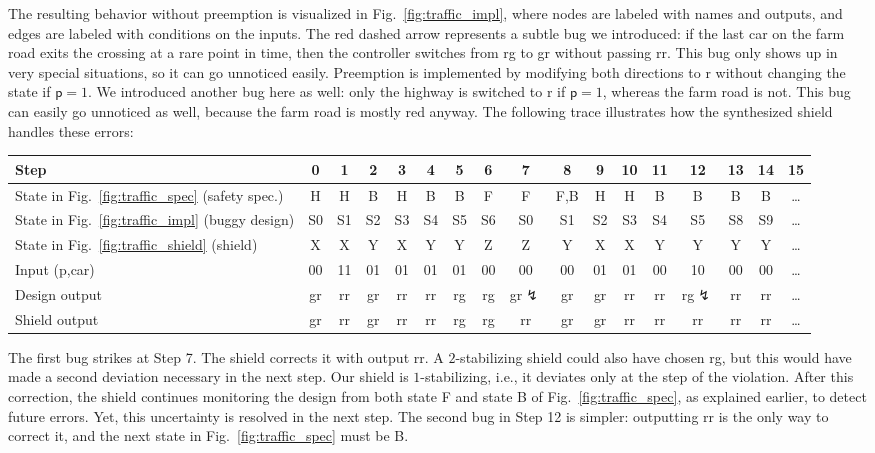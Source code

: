 \documentclass{llncs}
\newcommand{\err}{{\color{darkred}$\lightning$}}
\begin{document}
The resulting behavior without preemption is visualized in 
Fig.~\ref{fig:traffic_impl}, where nodes are labeled with names and 
outputs, and edges are labeled with conditions on the inputs.  The red 
dashed arrow represents a subtle bug we introduced: if the last car on 
the farm road exits the crossing at a rare point in time, then the 
controller switches from \textsf{rg} to \textsf{gr} without passing 
\textsf{rr}. This bug only shows up in very special situations, so it 
can go unnoticed easily.  Preemption is implemented by modifying both 
directions to \textsf{r} without changing the state if $\textsf{p}=1$.  
We introduced another bug here as well: only the highway is switched to 
\textsf{r} if $\textsf{p}=1$, whereas the farm road is not. This bug can 
easily go unnoticed as well, because the farm road is mostly red anyway.
The following trace illustrates how the synthesized shield handles these 
errors:

\begin{center}
\setlength{\tabcolsep}{1.3pt}
\begin{tabular}{l|c|c|c|c|c|c|c|c|c|c|c|c|c|c|c|c}\hline
Step                                 &0 &1 &2 &3 &4 &5 &6 &7     &8  &9 &10&11&12    &13&14&15    \\
\hline
State in Fig.~\ref{fig:traffic_spec} (safety spec.)
                                     &H &H &B &H &B &B &F &F     &F,B&H &H &B &B     &B &B &\ldots\\
State in Fig.~\ref{fig:traffic_impl} (buggy design)
                                     &S0&S1&S2&S3&S4&S5&S6&S0    &S1 &S2&S3&S4&S5    &S8&S9&\ldots\\
State in Fig.~\ref{fig:traffic_shield} (shield)
                                     &X &X &Y &X &Y &Y &Z &Z     &Y  &X &X &Y &Y     &Y &Y &\ldots\\

                                     
Input (\textsf{p,car})               &00&11&01&01&01&01&00&00    &00 &01&01&00&10    &00&00&\ldots\\
Design output                        &gr&rr&gr&rr&rr&rg&rg&gr\err&gr &gr&rr&rr&rg\err&rr&rr&\ldots\\
Shield output                        &gr&rr&gr&rr&rr&rg&rg&rr    &gr &gr&rr&rr&rr    &rr&rr&\ldots\\
\hline
\end{tabular}
\end{center}

\noindent
The first bug strikes at Step 7. The shield corrects it with output 
\textsf{rr}. A $2$-stabilizing shield could also have chosen 
\textsf{rg}, but this would have made a second deviation necessary in 
the next step. Our shield is $1$-stabilizing, i.e., it deviates only at 
the step of the violation. After this correction, the shield continues 
monitoring the design from both state F and state B of 
Fig.~\ref{fig:traffic_spec}, as explained earlier, to detect future 
errors. Yet, this uncertainty is resolved in the next step.  The second 
bug in Step 12 is simpler: outputting \textsf{rr} is the only way to 
correct it, and the next state in Fig.~\ref{fig:traffic_spec} must be B.
\end{document}

